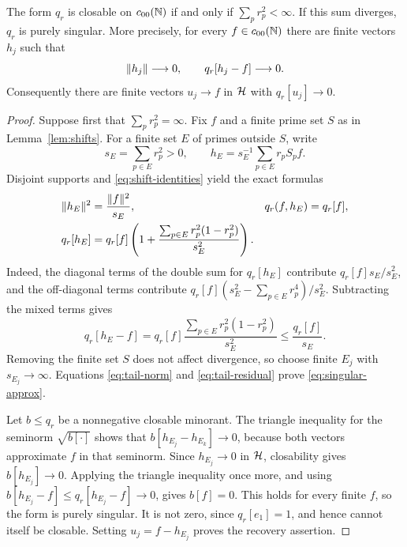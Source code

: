 \begin{proposition}
\label{prop:singularity}
The form $q_r$ is closable on $c_{00}(\mathbb{N})$ if and only if
$\sum_p r_p^2<\infty$. If this sum diverges, $q_r$ is purely singular.
More precisely, for every $f\in c_{00}(\mathbb{N})$ there are finite vectors $h_j$ such that
\begin{equation}
 \lVert h_j\rVert\longrightarrow0,\qquad
 q_r[h_j-f]\longrightarrow0.
 \label{eq:singular-approx}
\end{equation}
Consequently there are finite vectors $u_j\to f$ in $\mathcal{H}$ with
$q_r[u_j]\to0$.
\end{proposition}
\begin{proof}
Suppose first that $\sum_p r_p^2=\infty$.
Fix $f$ and a finite prime set $S$ as in Lemma~\ref{lem:shifts}.
For a finite set $E$ of primes outside $S$, write
\[
 s_E=\sum_{p\in E}r_p^2>0,\qquad
 h_E=s_E^{-1}\sum_{p\in E}r_pS_pf.
\]
Disjoint supports and \eqref{eq:shift-identities} yield the exact formulas
\begin{align}
 \lVert h_E\rVert^2&=\frac{\lVert f\rVert^2}{s_E},
 &q_r(f,h_E)&=q_r[f], \label{eq:tail-norm}\\
 q_r[h_E]&=
 q_r[f]\left(1+
  \frac{\sum_{p\in E}r_p^2(1-r_p^2)}{s_E^2}\right).
 \label{eq:tail-energy}
\end{align}
Indeed, the diagonal terms of the double sum for $q_r[h_E]$ contribute
$q_r[f]s_E/s_E^2$, and the off-diagonal terms contribute
$q_r[f](s_E^2-\sum_{p\in E}r_p^4)/s_E^2$.
Subtracting the mixed terms gives
\begin{equation}
 q_r[h_E-f]
 =q_r[f]\frac{\sum_{p\in E}r_p^2(1-r_p^2)}{s_E^2}
 \le \frac{q_r[f]}{s_E}.
 \label{eq:tail-residual}
\end{equation}
Removing the finite set $S$ does not affect divergence, so choose
finite $E_j$ with $s_{E_j}\to\infty$. Equations
\eqref{eq:tail-norm} and \eqref{eq:tail-residual} prove
\eqref{eq:singular-approx}.

Let $b\le q_r$ be a nonnegative closable minorant.
The triangle inequality for the seminorm $\sqrt{b[\cdot]}$ shows that
$b[h_{E_j}-h_{E_k}]\to0$, because both vectors approximate $f$ in that
seminorm. Since $h_{E_j}\to0$ in $\mathcal{H}$, closability gives
$b[h_{E_j}]\to0$. Applying the triangle inequality once more, and using
$b[h_{E_j}-f]\le q_r[h_{E_j}-f]\to0$, gives $b[f]=0$.
This holds for every finite $f$, so the form is purely singular.
It is not zero, since $q_r[e_1]=1$, and hence cannot itself be closable.
Setting $u_j=f-h_{E_j}$ proves the recovery assertion.


\end{proof}
